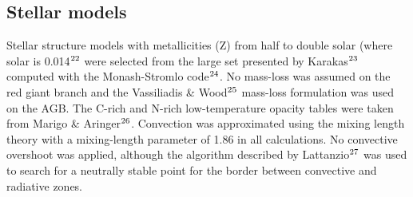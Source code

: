 \documentclass{nature}
\begin{document}
\newpage
\begin{methods}

\section*{Stellar models}
Stellar structure models 
with metallicities (Z) from half to double solar (where solar is 
0.014$^{\mbox{\scriptsize 22\if@tempswa , 1\fi}}$
were selected from the large set presented by 
Karakas$^{\mbox{\scriptsize 23\if@tempswa , 1\fi}}$
computed with the Monash-Stromlo code$^{\mbox{\scriptsize 24\if@tempswa , 1\fi}}$.
No mass-loss was assumed on the red giant branch and 
the Vassiliadis \& Wood$^{\mbox{\scriptsize 25\if@tempswa , 1\fi}}$
mass-loss formulation was used on the AGB. 
The C-rich and N-rich 
low-temperature opacity tables were taken from Marigo \& 
Aringer$^{\mbox{\scriptsize 26\if@tempswa , 1\fi}}$.
Convection was approximated using the mixing length theory with a mixing-length parameter of 1.86 
in all calculations. No 
convective overshoot was applied, although the algorithm described by 
Lattanzio$^{\mbox{\scriptsize 27\if@tempswa , 1\fi}}$
was used to search for a neutrally stable point for the border between convective and radiative 
zones. 


\end{methods}
\end{document}
